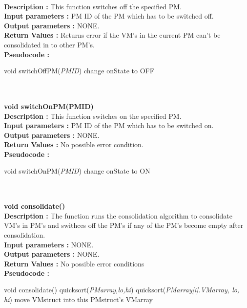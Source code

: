 ﻿\documentclass[a4paper,11pt]{article}
\begin{document}
\\
\textbf{Description :} This function switches off the specified PM.
\\
\textbf{Input parameters :} PM ID of the PM which has to be switched off.
\\
\textbf{Output parameters :} NONE.
\\
\textbf{Return Values :} Returns error if the VM's in the current PM can't be consolidated in to other PM's.
\\
\textbf{Pseudocode :}
\begin{algorithmic}[1]
\STATE void switchOffPM(\emph{PM\textunderscore ID})
\STATE change onState to OFF
\ENDIF
\ENDFOR
\end{algorithmic}
\mbox{}\\\\
\textbf{ void switchOnPM(PM\textunderscore ID)}
\\
\textbf{Description :} This function switches on the specified PM.
\\
\textbf{Input parameters :} PM ID of the PM which has to be switched on.
\\
\textbf{Output parameters :} NONE.
\\
\textbf{Return Values :} No possible error condition.
\\
\textbf{Pseudocode :}
\begin{algorithmic}[1]
\STATE void switchOnPM(\emph{PM\textunderscore ID})
\STATE change onState to ON
\ENDIF
\ENDFOR
\end{algorithmic}
\mbox{}\\\\
\textbf{ void consolidate()}
\\
\textbf{Description :} The function runs the consolidation algorithm to consolidate VM's in PM's and swithces 
off the PM's if any of the PM's become empty after consolidation.
\\
\textbf{Input parameters :} NONE.
\\
\textbf{Output parameters :} NONE.
\\
\textbf{Return Values :} No possible error conditions
\\
\textbf{Pseudocode :}
\begin{algorithmic}[1]
\STATE void consolidate()
\STATE quicksort(\emph{PMarray,lo,hi}) 
\STATE quicksort(\emph{PMarray[i].VMarray, lo, hi}) 
\STATE move VMstruct into this PMstruct's VMarray
\ENDIF
\ENDFOR
\ENDFOR
\ENDFOR
\end{algorithmic}
\end{document}
